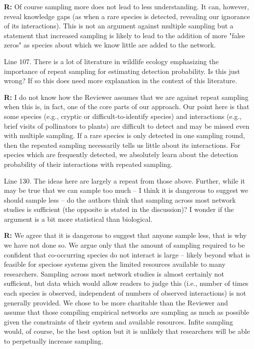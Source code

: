 \documentclass[12pt]{letter}
\newenvironment{refquote}{\bigskip \begin{it}}{\end{it}\smallskip}
\begin{document}
		\textbf{R:} Of course sampling more does not lead to less understanding. It can, however, reveal knowledge gaps (as when a rare species is detected, revealing our ignorance of its interactions). This is not an argument against multiple sampling but a statement that increased sampling is likely to lead to the addition of more "false zeros" as species about which we know little are added to the network.

		\begin{refquote}
		Line 107.  There is a lot of literature in wildlife ecology emphasizing the importance of repeat sampling for estimating detection probability.  Is this just wrong?  If so this does need more explanation in the context of this literature.
		\end{refquote}

		\textbf{R:} I do not know how the Reviewer assumes that we are against repeat sampling when this is, in fact, one of the core parts of our approach. Our point here is that some species (e.g., cryptic or difficult-to-identify species) and interactions (e.g., brief visits of pollinators to plants) are difficult to detect and may be missed even with multiple sampling. If a rare species is only detected in one sampling round, then the repeated sampling necessarily tells us little about its interactions. For species which are frequently detected, we absolutely learn about the detection probability of their interactions with repeated sampling.

		\begin{refquote}
		Line 130.  The ideas here are largely a repeat from those above.  Further, while it may be true that we can sample too much – I think it is dangerous to suggest we should sample less – do the authors think that sampling across most network studies is sufficient (the opposite is stated in the discussion)?  I wonder if the argument is a bit more statistical than biological.
		\end{refquote}

		\textbf{R:} We agree that it is dangerous to suggest that anyone sample less, that is why we have not done so. We argue only that the amount of sampling required to be confident that co-occurring species do not interact is large -- likely beyond what is feasible for speciose systems given the limited resources available to many researchers. Sampling across most network studies is almost certainly not sufficient, but data which would allow readers to judge this (i.e., number of times each species is observed, independent of numbers of observed interactions) is not generally provided. We chose to be more charitable than the Reviewer and assume that those compiling empirical networks are sampling as much as possible given the constraints of their system and available resources. Infite sampling would, of course, be the best option but it is unlikely that researchers will be able to perpetually increase sampling.
\end{document}
